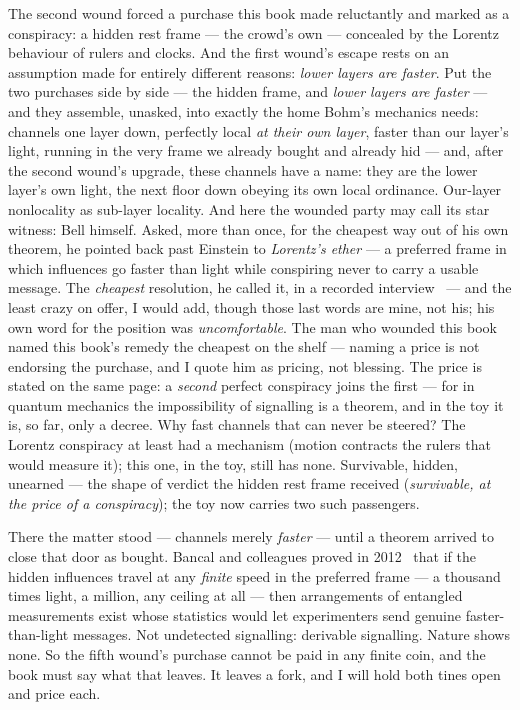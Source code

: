 \documentclass[fontsize=11pt,paper=a4,pagesize=auto,parskip=half-]{scrbook}
\begin{document}
The second wound forced a purchase this book made reluctantly and marked as a conspiracy: a hidden rest frame --- the crowd's own --- concealed by the Lorentz behaviour of rulers and clocks. And the first wound's escape rests on an assumption made for entirely different reasons: \emph{lower layers are faster}. Put the two purchases side by side --- the hidden frame, and \emph{lower layers are faster} --- and they assemble, unasked, into exactly the home Bohm's mechanics needs: channels one layer down, perfectly local \emph{at their own layer}, faster than our layer's light, running in the very frame we already bought and already hid --- and, after the second wound's upgrade, these channels have a name: they are the lower layer's own light, the next floor down obeying its own local ordinance. Our-layer nonlocality as sub-layer locality. And here the wounded party may call its star witness: Bell himself. Asked, more than once, for the cheapest way out of his own theorem, he pointed back past Einstein to \emph{Lorentz's ether} --- a preferred frame in which influences go faster than light while conspiring never to carry a usable message. The \emph{cheapest} resolution, he called it, in a recorded interview~\cite[48--49]{davies1986} --- and the least crazy on offer, I would add, though those last words are mine, not his; his own word for the position was \emph{uncomfortable}. The man who wounded this book named this book's remedy the cheapest on the shelf --- naming a price is not endorsing the purchase, and I quote him as pricing, not blessing. The price is stated on the same page: a \emph{second} perfect conspiracy joins the first --- for in quantum mechanics the impossibility of signalling is a theorem, and in the toy it is, so far, only a decree. Why fast channels that can never be steered? The Lorentz conspiracy at least had a mechanism (motion contracts the rulers that would measure it); this one, in the toy, still has none. Survivable, hidden, unearned --- the shape of verdict the hidden rest frame received (\emph{survivable, at the price of a conspiracy}); the toy now carries two such passengers.

There the matter stood --- channels merely \emph{faster} --- until a theorem arrived to close that door as bought. Bancal and colleagues proved in 2012~\cite{bancal2012} that if the hidden influences travel at any \emph{finite} speed in the preferred frame --- a thousand times light, a million, any ceiling at all --- then arrangements of entangled measurements exist whose statistics would let experimenters send genuine faster-than-light messages. Not undetected signalling: derivable signalling. Nature shows none. So the fifth wound's purchase cannot be paid in any finite coin, and the book must say what that leaves. It leaves a fork, and I will hold both tines open and price each.
\end{document}
